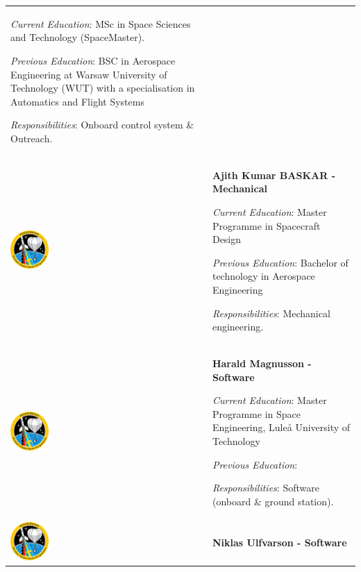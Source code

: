 \begin{longtable}[]{m{} m{}}
\smallskip
\textit{Current Education}: MSc in Space Sciences and Technology (SpaceMaster).

\smallskip
\textit{Previous Education}: BSC in Aerospace Engineering at Warsaw University of Technology (WUT) with a specialisation in Automatics and Flight Systems

\smallskip
\textit{Responsibilities}: Onboard control system \& Outreach.
\bigskip
\\

\includegraphics[width=0.2\textwidth]{0-cover/img/logo-rexus-bexus.png}  & \textbf{Ajith Kumar BASKAR - Mechanical}

\smallskip
\textit{Current Education}: Master Programme in Spacecraft Design

\smallskip
\textit{Previous Education}: Bachelor of technology in Aerospace Engineering

\smallskip
\textit{Responsibilities}: Mechanical engineering.
\bigskip
\\

\includegraphics[width=0.2\textwidth]{0-cover/img/logo-rexus-bexus.png}  & \textbf{Harald Magnusson - Software}

\smallskip
\textit{Current Education}: Master Programme in Space Engineering, Luleå University of Technology

\smallskip
\textit{Previous Education}:

\smallskip
\textit{Responsibilities}: Software (onboard \& ground station).
\bigskip
\\

\includegraphics[width=0.2\textwidth]{0-cover/img/logo-rexus-bexus.png}  & \textbf{Niklas Ulfvarson - Software}


\end{longtable}
